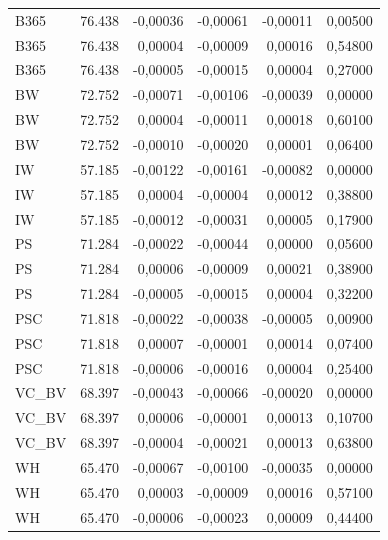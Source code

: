 {\begin{longtable}{@{}lrrrrr@{}}
B365 & 76.438 & -0,00036 & -0,00061 & -0,00011 & 0,00500 \\
B365 & 76.438 & 0,00004 & -0,00009 & 0,00016 & 0,54800 \\
B365 & 76.438 & -0,00005 & -0,00015 & 0,00004 & 0,27000 \\
BW & 72.752 & -0,00071 & -0,00106 & -0,00039 & 0,00000 \\
BW & 72.752 & 0,00004 & -0,00011 & 0,00018 & 0,60100 \\
BW & 72.752 & -0,00010 & -0,00020 & 0,00001 & 0,06400 \\
IW & 57.185 & -0,00122 & -0,00161 & -0,00082 & 0,00000 \\
IW & 57.185 & 0,00004 & -0,00004 & 0,00012 & 0,38800 \\
IW & 57.185 & -0,00012 & -0,00031 & 0,00005 & 0,17900 \\
PS & 71.284 & -0,00022 & -0,00044 & 0,00000 & 0,05600 \\
PS & 71.284 & 0,00006 & -0,00009 & 0,00021 & 0,38900 \\
PS & 71.284 & -0,00005 & -0,00015 & 0,00004 & 0,32200 \\
PSC & 71.818 & -0,00022 & -0,00038 & -0,00005 & 0,00900 \\
PSC & 71.818 & 0,00007 & -0,00001 & 0,00014 & 0,07400 \\
PSC & 71.818 & -0,00006 & -0,00016 & 0,00004 & 0,25400 \\
VC\_BV & 68.397 & -0,00043 & -0,00066 & -0,00020 & 0,00000 \\
VC\_BV & 68.397 & 0,00006 & -0,00001 & 0,00013 & 0,10700 \\
VC\_BV & 68.397 & -0,00004 & -0,00021 & 0,00013 & 0,63800 \\
WH & 65.470 & -0,00067 & -0,00100 & -0,00035 & 0,00000 \\
WH & 65.470 & 0,00003 & -0,00009 & 0,00016 & 0,57100 \\
WH & 65.470 & -0,00006 & -0,00023 & 0,00009 & 0,44400 \\
\end{longtable}
}

